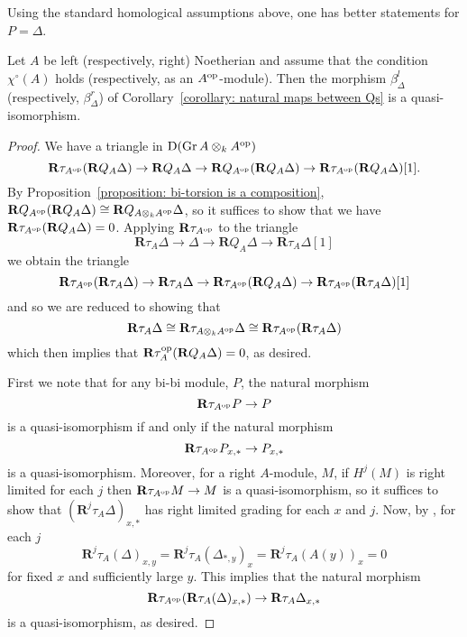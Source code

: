 Using the standard homological assumptions above, one has better statements for \(P = \Delta\). 

\begin{proposition} \label{proposition: when beta is an isomorphism}
  Let \(A\) be left (respectively, right) Noetherian and assume that the condition \(\chi^\circ(A)\) holds (respectively, as an \(A^{\operatorname{op}}\)-module).
  Then the morphism \(\beta^l_{\Delta}\) (respectively, \(\beta^r_{\Delta}\)) of Corollary~\ref{corollary: natural maps between Qs} is a quasi-isomorphism.
  
\end{proposition}

\begin{proof}
  We have a triangle in \(\mathrm{D}(\operatorname{Gr}A \otimes_k A^{\operatorname{op}})\)
  \[\mathbf{R}\tau_{A^{\operatorname{op}}} (\mathbf{R}Q_A \Delta) \to \mathbf{R}Q_A \Delta \to \mathbf{R}Q_{A^{\operatorname{op}}} (\mathbf{R}Q_A \Delta) \to \mathbf{R}\tau_{A^{\operatorname{op}}} (\mathbf{R}Q_A \Delta)[1].\]
  By Proposition~\ref{proposition: bi-torsion is a composition}, \(\mathbf{R}Q_{A^{\operatorname{op}}}(\mathbf{R}Q_A \Delta) \cong \mathbf{R}Q_{A \otimes_k A^{\operatorname{op}}} \Delta\), so it suffices to show that we have \(\mathbf{R}\tau_{A^{\operatorname{op}}}(\mathbf{R}Q_A \Delta) = 0\).
  Applying \(\mathbf{R}\tau_{A^{\operatorname{op}}}\) to the triangle
  \[\mathbf{R}\tau_A \Delta \to \Delta \to \mathbf{R}Q_A \Delta \to \mathbf{R}\tau_A \Delta[1]\]
  we obtain the triangle
  \[\mathbf{R}\tau_{A^{\operatorname{op}}} (\mathbf{R}\tau_A \Delta) \to \mathbf{R}\tau_A \Delta \to \mathbf{R}\tau_{A^{\operatorname{op}}} (\mathbf{R}Q_A \Delta) \to \mathbf{R}\tau_{A^{\operatorname{op}}} (\mathbf{R}\tau_A \Delta)[1]\]
  and so we are reduced to showing that
  \[\mathbf{R}\tau_A \Delta \cong \mathbf{R}\tau_{A \otimes_k A^{\operatorname{op}}}\Delta \cong \mathbf{R}\tau_{A^{\operatorname{op}}} (\mathbf{R}\tau_A \Delta)\]
  which then implies that \(\mathbf{R}\tau_A^{\operatorname{op}}(\mathbf{R}Q_A \Delta) = 0\), as desired.

  First we note that for any bi-bi module, \(P\), the natural morphism
  \[\mathbf{R}\tau_{A^{\operatorname{op}}} P \to P\]
  is a quasi-isomorphism if and only if the natural morphism
  \[\mathbf{R}\tau_{A^{\operatorname{op}}} P_{x,\ast} \to P_{x,\ast}\]
  is a quasi-isomorphism.
  Moreover, for a right \(A\)-module, \(M\), if \(H^j(M)\) is right limited for each \(j\) then \(\mathbf{R} \tau_{A^{\operatorname{op}}} M \to M\) is a quasi-isomorphism,
  so it suffices to show that \((\mathbf{R}^j \tau_A \Delta)_{x,\ast}\) has right limited grading for each \(x\) and \(j\).
  Now, by \parencite[Cor. 3.6 (3)]{AZ94}, for each \(j\)
  \[\mathbf{R}^j\tau_A(\Delta)_{x,y} = \mathbf{R}^j\tau_A(\Delta_{\ast,y})_x = \mathbf{R}^j\tau_A(A(y))_x = 0\]
  for fixed \(x\) and sufficiently large \(y\).
  This implies that the natural morphism
  \[\mathbf{R}\tau_{A^{\operatorname{op}}}(\mathbf{R}\tau_A(\Delta)_{x,\ast}) \to \mathbf{R}\tau_A\Delta_{x,\ast}\]
  is a quasi-isomorphism, as desired.
\end{proof}

